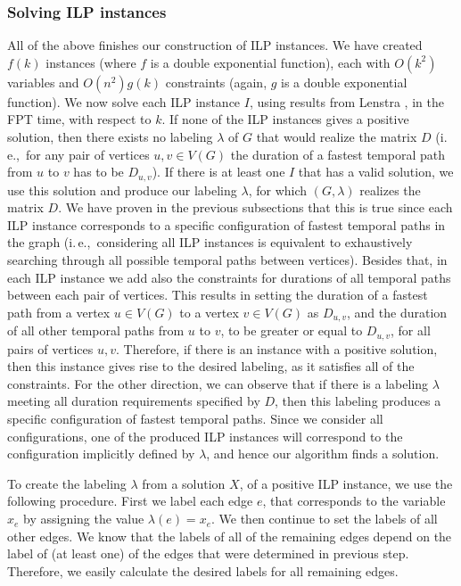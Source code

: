 \documentclass[a4paper,UKenglish,cleveref, autoref, thm-restate]{lipics-v2021}
\newcommand{\ie}{i.\,e.,\ }
\begin{document}
\subsubsection{Solving ILP instances}
All of the above finishes our construction of ILP instances.
We have created $f(k)$ instances (where $f$ is a double exponential function), 
each with $O(k^2)$ variables and $O(n^2) g(k)$ constraints (again, $g$ is a double exponential function).
We now solve each ILP instance $I$, using results from Lenstra \cite{Lenstra1983Integer},
in the FPT time, with respect to $k$.
%
If none of the ILP instances gives a positive solution, then there exists no labeling $\lambda$ of $G$ that would realize the matrix $D$ (\ie for any pair of vertices $u,v \in V(G)$ the duration of a fastest temporal path from $u$ to $v$ has to be $D_{u,v}$).
If there is at least one $I$ that has a valid solution, 
we use this solution and produce our labeling $\lambda$, for which $(G,\lambda)$ realizes the matrix $D$.
We have proven in the previous subsections that this is true since each ILP instance corresponds to a specific configuration of fastest temporal paths in the graph (\ie considering all ILP instances is equivalent to exhaustively searching through all possible temporal paths between vertices).
Besides that, in each ILP instance we add also the constraints for durations of all temporal paths between each pair of vertices.
This results in setting the duration of a fastest path from a vertex $u \in V(G)$ to a vertex $v \in V(G)$ as $D_{u,v}$,
and the duration of all other temporal paths from $u$ to $v$, to be greater or equal to $D_{u,v}$,
for all pairs of vertices $u,v$.
Therefore, if there is an instance with a positive solution, then this instance gives rise to the desired labeling, as it satisfies all of the constraints.
For the other direction, we can observe that if there is a labeling $\lambda$ meeting all duration requirements specified by $D$, then this labeling produces a specific configuration of fastest temporal paths. Since we consider all configurations, one of the produced ILP instances will correspond to the configuration implicitly defined by $\lambda$, and hence our algorithm finds a solution.

To create the labeling $\lambda$ from a solution $X$, of a positive ILP instance,
we use the following procedure.
First we
label each edge $e$, that corresponds to the variable $x_e$
by assigning the value $\lambda(e) = x_e$.
We then continue to set the labels of all other edges. 
We know that the labels of all of the remaining edges depend on the label of (at least one) of the edges that were determined in previous step. 
Therefore, we easily calculate the desired labels for all remaining edges.
\end{document}
